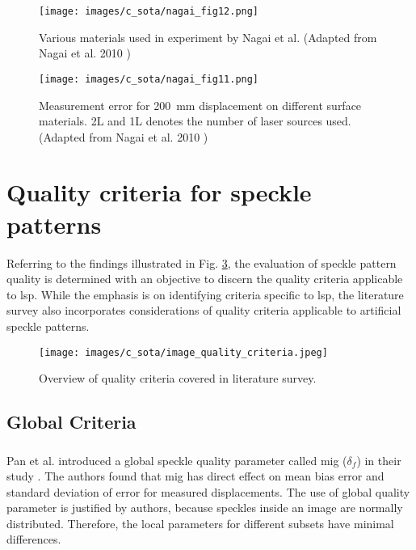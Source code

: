     \begin{figure}[h]
        \centering
        \texttt{[image: images/c\_sota/nagai\_fig12.png]}
        \caption{Various materials used in experiment by Nagai et al. (Adapted from Nagai et al. 2010 \cite{nagai})}
        \label{fig:nagai_fig12}
    \end{figure}

    \begin{figure}[h]
        \centering
        \texttt{[image: images/c\_sota/nagai\_fig11.png]}
        \caption{Measurement error for \SI{200}{\milli\meter} displacement on different surface materials. 2L and 1L denotes the number of laser sources used. (Adapted from Nagai et al. 2010 \cite{nagai})}
        \label{fig:nagai_fig11}
    \end{figure}

    
\section{Quality criteria for speckle patterns} \label{section:quality_lsp}

Referring to the findings illustrated in Fig. \ref{fig:image_quality_criteria.jpeg}, the evaluation of speckle pattern quality is determined with an objective to discern the quality criteria applicable to \gls{lsp}. While the emphasis is on identifying criteria specific to \gls{lsp}, the literature survey also incorporates considerations of quality criteria applicable to artificial speckle patterns.

\begin{figure}
    \centering
    \texttt{[image: images/c\_sota/image\_quality\_criteria.jpeg]}
    \caption{Overview of quality criteria covered in literature survey.}
    \label{fig:image_quality_criteria.jpeg}
\end{figure}

    \subsection{Global Criteria}
    
    \subsubsection{}\label{subsubsection:mig}

        Pan et al. introduced a global speckle quality parameter called \gls{mig} ($\delta_f$) in their study \cite{pan_mig}. The authors found that \gls{mig} has direct effect on mean bias error and standard deviation of error for measured displacements. The use of global quality parameter is justified by authors, because speckles inside an image are normally distributed. Therefore, the local parameters for different subsets have minimal differences.

